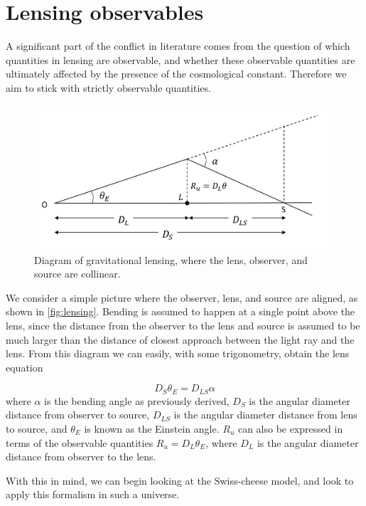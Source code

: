 \section{Lensing observables}

A significant part of the conflict in literature comes from the question of which quantities in lensing are observable, and whether these observable quantities are ultimately affected by the presence of the cosmological constant. Therefore we aim to stick with strictly observable quantities. 

\begin{figure}
  \centering
  \includegraphics[height=0.4\linewidth]{images/lensing_cropped.pdf}
  \caption{Diagram of gravitational lensing, where the lens, observer, and source are collinear.}
  \label{fig:lensing}
\end{figure}

We consider a simple picture where the observer, lens, and source are aligned, as shown in \autoref{fig:lensing}. Bending is assumed to happen at a single point above the lens, since the distance from the observer to the lens and source is assumed to be much larger than the distance of closest approach between the light ray and the lens. From this diagram we can easily, with some trigonometry, obtain the lens equation \citep{schneider1992gravitationallenses}

\begin{equation}
  D_S \theta_E = D_{LS} \alpha
  \label{eq:lens-eqn}
\end{equation}
where $\alpha$ is the bending angle as previously derived, $D_S$ is the angular diameter distance from observer to source, $D_{LS}$ is the angular diameter distance from lens to source, and $\theta_E$ is known as the Einstein angle. $R_u$ can also be expressed in terms of the observable quantities $R_u = D_L \theta_E$, where $D_L$ is the angular diameter distance from observer to the lens.  

With this in mind, we can begin looking at the Swiss-cheese model, and look to apply this formalism in such a universe. 